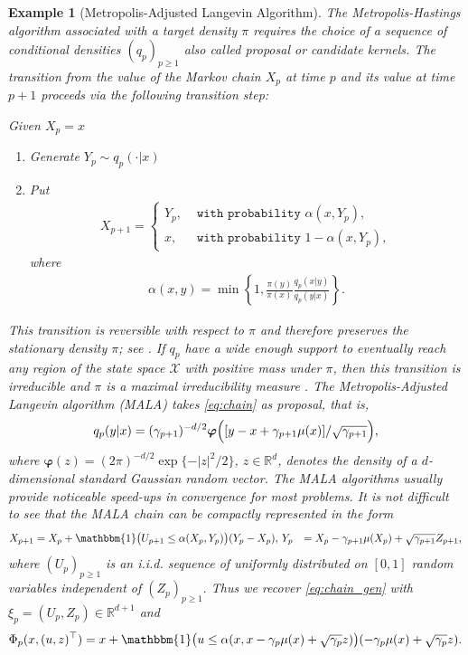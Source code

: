 \documentclass[bj]{imsart}
\newtheorem{example}{Example}
\begin{document}
\begin{example}[Metropolis-Adjusted Langevin Algorithm]
The Metropolis-Hastings algorithm
associated with a target density \(\pi\) requires the choice of a sequence of conditional densities  \((q_p)_{p\geq 1}\) also called proposal or candidate kernels. The transition from the value  of the Markov chain \(X_p\)  at time \(p\)
and its value at time \(p + 1\) proceeds via the following transition step:

\begin{algorithm}[H]
Given \(X_p=x\)\;
\begin{enumerate}
\item Generate \(Y_p\sim q_p(\cdot|x)\)\;
\item Put
\begin{eqnarray*}
X_{p+1}=
\begin{cases}
Y_p, & \texttt{ with probability } \alpha(x,Y_p),
\\
x, &  \texttt{ with probability } 1-\alpha(x,Y_p),
\end{cases}
\end{eqnarray*}
where
\begin{eqnarray*}
\alpha(x,y)=\min\left\{1,\frac{\pi(y)}{\pi(x)}\frac{q_p(x|y)}{q_p(y|x)}\right\}.
\end{eqnarray*}
\end{enumerate}
\end{algorithm}
This transition is reversible with respect to \(\pi\) and therefore preserves the stationary density \(\pi\); see \cite[Chapter~2]{moulines2018}. If \(q_p\) have a wide enough
support to eventually reach any region
of the state space \(\mathcal{X}\) with positive mass
under \(\pi\), then this transition is irreducible and $\pi$ is a maximal irreducibility measure \cite{mengersen:tweedie:1996}. The  Metropolis-Adjusted Langevin algorithm (MALA) takes  \eqref{eq:chain} as proposal, that is,
\begin{eqnarray*}
q_p(y|x)=(\gamma_{p+1})^{-d/2}\boldsymbol{\varphi}\Bigl([y-x+\gamma_{p+1}\mu(x)]/\sqrt{\gamma_{p+1}}\Bigr),
\end{eqnarray*}
where
$\boldsymbol{\varphi}(z)=(2\pi)^{-d/2} \exp\{-|z|^2/2\}$,
$z\in\mathbb R^d$, denotes the density of a $d$-dimensional
standard Gaussian random vector.  The MALA algorithms usually provide noticeable speed-ups in convergence for most problems. It is not difficult to see that the MALA chain can be compactly represented in the form
\begin{align*}
X_{p+1} &=X_p+\mathbbm{1}\bigl(U_{p+1}\leq \alpha(X_{p},Y_{p})\bigr)(Y_{p}-X_p),  \,
Y_{p}&=X_p-\gamma_{p+1}\mu(X_p)+\sqrt{\gamma_{p+1}}Z_{p+1},
\end{align*}
where \((U_{p})_{p\geq 1}\) is an i.i.d. sequence of uniformly distributed on \([0,1]\) random variables independent of \((Z_p)_{p\geq 1}.\) Thus we recover \eqref{eq:chain_gen} with  \(\xi_p=(U_p,Z_p)\in \mathbb{R}^{d+1}\) and
\begin{eqnarray*}
\Phi_p(x,(u,z)^\top)=x+\mathbbm{1}\bigl(u\leq \alpha(x,x-\gamma_{p}\mu(x)+\sqrt{\gamma_{p}}z)\bigr)(-\gamma_{p}\mu(x)+\sqrt{\gamma_{p}}z).
\end{eqnarray*}
\end{example}
\end{document}
